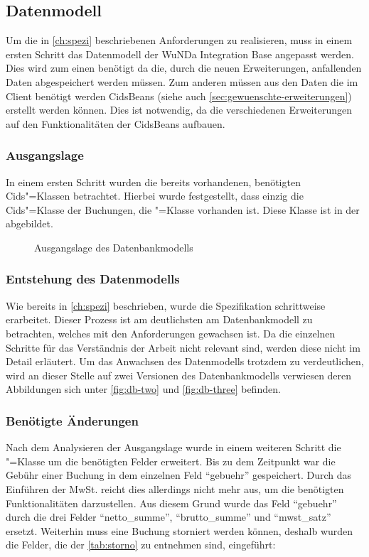 \subsection{Datenmodell}
Um die in \autoref{ch:spezi} beschriebenen Anforderungen zu realisieren, muss in einem ersten Schritt das Datenmodell der \ac{WuNDa} Integration Base angepasst werden.
Dies wird zum einen benötigt da die, durch die neuen Erweiterungen, anfallenden Daten abgespeichert werden müssen.
Zum anderen müssen aus den Daten die im Client benötigt werden CidsBeans (siehe auch \autoref{sec:gewuenschte-erweiterungen}) erstellt werden können.
Dies ist notwendig, da die verschiedenen Erweiterungen auf den Funktionalitäten der CidsBeans aufbauen.

\subsubsection{Ausgangslage}
In einem ersten Schritt wurden die bereits vorhandenen, benötigten Cids"=Klassen betrachtet. Hierbei wurde festgestellt, dass einzig die Cids"=Klasse der Buchungen, die "=Klasse vorhanden ist. Diese Klasse ist in der  abgebildet.
\begin{figure}[htb]
	\centering
	\caption{Ausgangslage des Datenbankmodells}
	\label{fig:db-billing}
\end{figure}

\subsubsection{Entstehung des Datenmodells}
Wie bereits in \autoref{ch:spezi} beschrieben, wurde die Spezifikation schrittweise erarbeitet.
Dieser Prozess ist am deutlichsten am Datenbankmodell zu betrachten, welches mit den Anforderungen gewachsen ist.
Da die einzelnen Schritte für das Verständnis der Arbeit nicht relevant sind, werden diese nicht im Detail erläutert.
Um das Anwachsen des Datenmodells trotzdem zu verdeutlichen, wird an dieser Stelle auf zwei Versionen des Datenbankmodells verwiesen deren Abbildungen sich unter \ref{fig:db-two} und \ref{fig:db-three} befinden.

\subsubsection{Benötigte Änderungen}
Nach dem Analysieren der Ausgangslage wurde in einem weiteren Schritt die "=Klasse um die benötigten Felder erweitert.
Bis zu dem Zeitpunkt war die Gebühr einer Buchung in dem einzelnen Feld "`gebuehr"' gespeichert.
Durch das Einführen der MwSt. reicht dies allerdings nicht mehr aus, um die benötigten Funktionalitäten darzustellen.
Aus diesem Grund wurde das Feld  "`gebuehr"' durch die drei Felder "`netto\_summe"', "`brutto\_summe"' und "`mwst\_satz"' ersetzt.
Weiterhin muss eine Buchung storniert werden können, deshalb wurden die Felder, die der \autoref{tab:storno} zu entnehmen sind, eingeführt:


